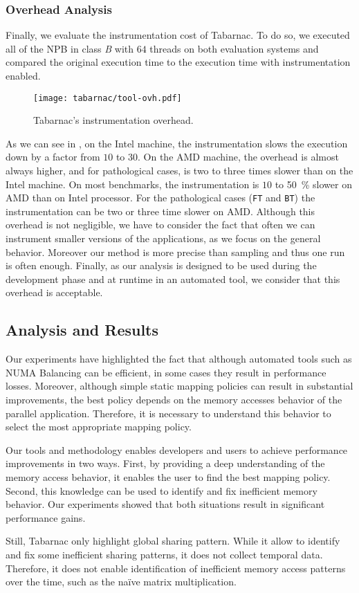 \subsubsection{Overhead Analysis}

Finally,  we evaluate the instrumentation cost of \gls{Tabarnac}.
To do so, we executed all of the \gls{NPB} in class \emph{B} with $64$ threads on both evaluation systems and compared the original execution time to the execution time with instrumentation enabled.

\begin{figure}[htb]
    \centering
    \texttt{[image: tabarnac/tool-ovh.pdf]}
    \caption{Tabarnac's instrumentation overhead.}
    \label{fig:ovh-tabarnac}
\end{figure}

As we can see in , on the Intel machine, the instrumentation slows the execution down by a factor from $10$ to $30$.
On the AMD machine, the overhead is almost always higher, and for pathological cases, is two to three times slower than on the Intel machine.
On most benchmarks, the instrumentation is $10$ to \SI{50}{\%} slower on AMD than on Intel processor.
For the pathological cases (\texttt{FT} and \texttt{BT}) the instrumentation can be two or three time slower on AMD.
Although this overhead is not negligible, we have to consider the fact that often we can instrument smaller versions of the applications, as we focus on the general behavior.
Moreover our method is more precise than sampling and thus one run is often enough.
Finally, as our analysis is designed to be used during the development phase and at runtime in an automated tool, we consider that this overhead is acceptable.


\subsection{Analysis and Results}

Our experiments have highlighted the fact that although automated tools such as \gls{NUMA} Balancing can be efficient, in some cases they result in performance losses.
Moreover, although simple static mapping policies can result in substantial improvements, the best policy depends on the memory accesses behavior of the parallel application.
Therefore, it is necessary to understand this behavior to select the most appropriate mapping policy.

Our tools and methodology enables developers and users to achieve performance improvements in two ways.
First, by providing a deep understanding of the memory access behavior, it enables the user to find the best mapping policy.
Second, this knowledge can be used to identify and fix inefficient memory behavior.
Our experiments showed that both situations result in significant performance gains.

Still, \gls{Tabarnac} only highlight global sharing pattern.
While it allow to identify and fix some inefficient sharing patterns, it does not collect temporal data.
Therefore, it does not enable identification of inefficient memory access patterns over the time, such as the naïve matrix multiplication.

